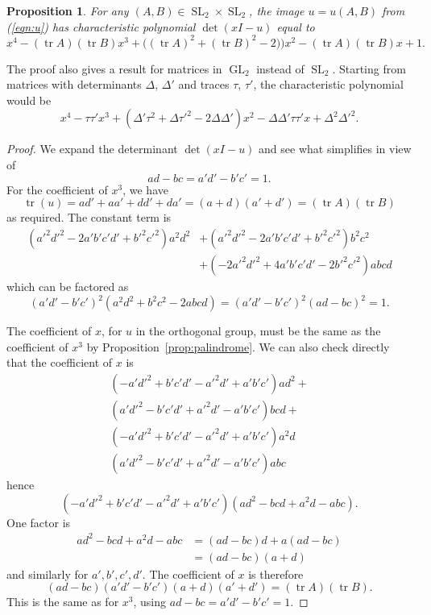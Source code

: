 \documentclass[11pt]{amsart}
\newtheorem{proposition}[theorem]{Proposition}
\theoremstyle{definition}
\numberwithin{figure}{section}
\numberwithin{equation}{section}
\numberwithin{table}{section}
\newcommand{\SL}{\operatorname{SL}}
\newcommand{\GL}{\operatorname{GL}}
\newcommand{\tr}{\operatorname{tr}}
\begin{document}
\begin{proposition} \label{prop:charpoly}
For any $(A,B) \in \SL_2 \times \SL_2$, the image $u=u(A,B)$ from (\ref{eqn:u}) has characteristic polynomial $\det(xI-u)$ equal to
\[
x^4 - (\tr{A})(\tr{B})x^3 + \big( (\tr{A})^2+(\tr{B})^2-2) \big)x^2 - (\tr{A})(\tr{B})x + 1
.
\]
\end{proposition}

The proof also gives a result for matrices in $\GL_2$ instead of $\SL_2$.
Starting from matrices with determinants $\Delta$, $\Delta'$ and traces $\tau$, $\tau'$, the characteristic polynomial would be
\[
x^4 - \tau \tau' x^3 + (\Delta' \tau^2 + \Delta \tau'^2 - 2\Delta \Delta') x^2 - \Delta \Delta' \tau \tau' x + \Delta^2 \Delta'^2.
\]

\begin{proof}
We expand the determinant $\det(xI-u)$ and see what simplifies in view of
\[
ad-bc=a'd'-b'c' = 1.
\]
For the coefficient of $x^3$, we have
\[
\tr(u) = ad'+aa'+dd'+da' = (a+d)(a'+d')=(\tr{A})(\tr{B})
\]
as required.
The constant term is
\begin{align*}
(a'^2d'^2-2a'b'c'd'+b'^2c'^2)a^2d^2 &+ (a'^2d'^2-2a'b'c'd'+b'^2c'^2)b^2c^2 \\
&+ (-2a'^2d'^2+4a'b'c'd'-2b'^2c'^2)abcd
\end{align*}
which can be factored as
\[
(a'd'-b'c')^2(a^2d^2+b^2c^2-2abcd) = (a'd'-b'c')^2(ad-bc)^2=1.
\]

The coefficient of $x$, for $u$ in the orthogonal group, must be the same as the coefficient of $x^3$ by Proposition~\ref{prop:palindrome}.
We can also check directly that the coefficient of $x$ is
\begin{align*}
(-a'd'^2+b'c'd'-a'^2d'+a'b'c' ) ad^2 + \\
(a'd'^2-b'c'd'+a'^2d'-a'b'c' ) bcd + \\
(-a'd'^2+b'c'd'-a'^2d'+a'b'c' ) a^2d \\
(a'd'^2-b'c'd'+a'^2d'-a'b'c' ) abc
\end{align*}
hence
\[
(-a'd'^2+b'c'd'-a'^2d'+a'b'c')(ad^2-bcd+a^2d-abc).
\]
One factor is
\begin{align*}
ad^2-bcd+a^2d-abc &= (ad-bc)d+a(ad-bc) \\
&= (ad-bc)(a+d)
\end{align*}
and similarly for $a',b',c',d'$.
The coefficient of $x$ is therefore
\[
(ad-bc)(a'd'-b'c')(a+d)(a'+d') = (\tr{A})(\tr{B}).
\]
This is the same as for $x^3$, using $ad-bc=a'd'-b'c'=1$.


\end{proof}
\end{document}
